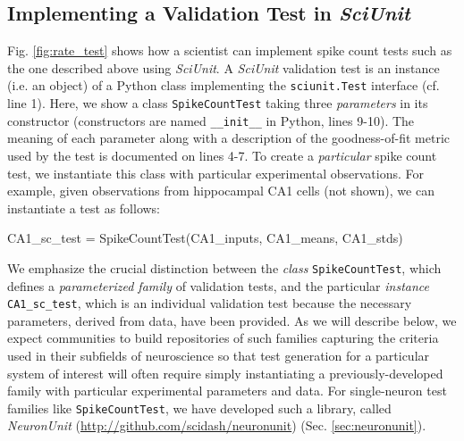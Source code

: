 \documentclass[9pt]{sig-alternate}
\let\verbx\lstinline
\begin{document}
\subsection{Implementing a Validation Test in \textit{SciUnit}}
Fig. \ref{fig:rate_test} shows how a scientist can implement spike count tests such as the one described above using \textit{SciUnit}. 
A \textit{SciUnit} validation test is an {instance} (i.e. an object) of a Python class implementing the \verbx{sciunit.Test} interface (cf. line 1). 
Here, we show a class \verbx{SpikeCountTest} taking three \emph{parameters} in its constructor (constructors are named \verbx{__init__} in Python, lines 9-10). 
The meaning of each parameter along with a description of the goodness-of-fit metric used by the test is documented on lines 4-7. 
To create a \emph{particular} spike count test, we instantiate this class with particular experimental observations. 
For example, given observations from hippocampal CA1 cells (not shown), we can instantiate a test as follows:
\begin{python}
  CA1_sc_test = SpikeCountTest(CA1_inputs, CA1_means, CA1_stds)
\end{python}
We emphasize the crucial distinction between the \textit{class} \verbx{SpikeCountTest}, which defines a \emph{parameterized family} of validation tests, and the particular \textit{instance} \verbx{CA1_sc_test}, which is an individual validation test because the necessary parameters, derived from data, have been provided. 
As we will describe below, we expect communities to build repositories of such families capturing the criteria used in their subfields of neuroscience so that test generation for a particular system of interest will often require simply instantiating a previously-developed family with particular experimental parameters and data. 
For single-neuron test families like \verbx{SpikeCountTest}, we have developed such a library, called \textit{NeuronUnit} (\url{http://github.com/scidash/neuronunit}) (Sec. \ref{sec:neuronunit}). 
\end{document}
